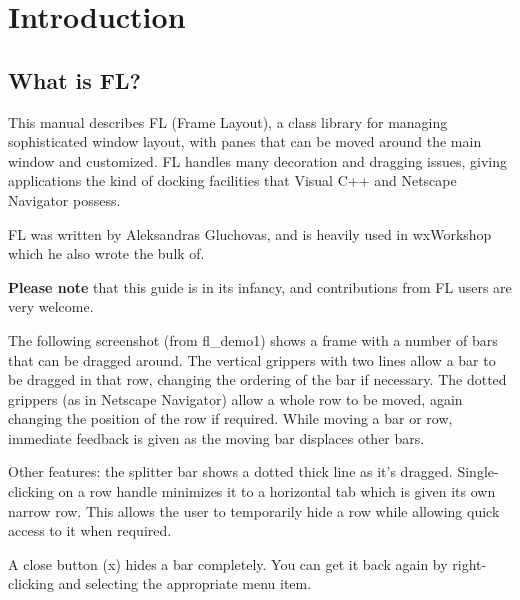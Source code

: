 
\chapter{Introduction}\label{introduction}
%
%
\setfooter{\thepage}{}{}{}{}{\thepage}%

\section{What is FL?}\label{whatisfl}

This manual describes FL (Frame Layout), a
class library for managing sophisticated window layout,
with panes that can be moved around the main window
and customized. FL handles many decoration and dragging
issues, giving applications the kind of docking facilities
that Visual C++ and Netscape Navigator possess.

FL was written by Aleksandras Gluchovas, and is heavily used in
wxWorkshop which he also wrote the bulk of.

{\bf Please note} that this guide is in its infancy, and contributions
from FL users are very welcome.

The following screenshot (from fl\_demo1) shows a frame with a number of
bars that can be dragged around. The vertical grippers with
two lines allow a bar to be dragged in that row, changing the
ordering of the bar if necessary.
The dotted grippers (as in Netscape Navigator) allow
a whole row to be moved, again changing the position of the row
if required. While moving a bar or row, immediate feedback
is given as the moving bar displaces other bars.

Other features: the splitter bar shows a dotted thick line as
it's dragged. Single-clicking on a row handle minimizes it to
a horizontal tab which is given its own narrow row. This allows
the user to temporarily hide a row while allowing quick access
to it when required.

A close button (x) hides a bar completely. You can get it back again
by right-clicking and selecting the appropriate menu item.

